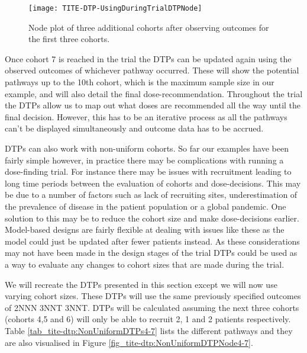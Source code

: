 \begin{figure}[h!]
	\centering
	\caption[DTP node plot for three additional cohorts.]{Node plot of three additional cohorts after observing outcomes for the first three cohorts.}
	\label{fig_tite-dtp:UsingDuringTrialDTPNode4-7}
	\texttt{[image: TITE-DTP-UsingDuringTrialDTPNode]}
\end{figure}

Once cohort 7 is reached in the trial the DTPs can be updated again using the observed outcomes of whichever pathway occurred. These will show the potential pathways up to the 10th cohort, which is the maximum sample size in our example, and will also detail the final dose-recommendation. Throughout the trial the DTPs allow us to map out what doses are recommended all the way until the final decision. However, this has to be an iterative process as all the pathways can't be displayed simultaneously and  outcome data has to be accrued. 

DTPs can also work with non-uniform cohorts. So far our examples have been fairly simple however, in practice there may be complications with running a dose-finding trial. For instance there may be issues with recruitment leading to long time periods between the evaluation of cohorts and dose-decisions. This may be due to a number of factors such as lack of recruiting sites, underestimation of the prevalence of disease in the patient population or a global pandemic. One solution to this may be to reduce the cohort size and make dose-decisions earlier. Model-based designs are fairly flexible at dealing with issues like these as the model could just be updated after fewer patients instead. As these considerations may not have been made in the design stages of the trial DTPs could be used as a way to evaluate any changes to cohort sizes that are made during the trial. 

We will recreate the DTPs presented in this section except we will now use varying cohort sizes. These DTPs will use the same previously specified outcomes of 2NNN 3NNT 3NNT. DTPs will be calculated assuming the next three cohorts (cohorts 4,5 and 6) will only be able to recruit 2, 1 and 2 patients respectively. Table \ref{tab_tite-dtp:NonUniformDTPs4-7} lists the different pathways and they are also visualised in Figure \ref{fig_tite-dtp:NonUniformDTPNode4-7}. 

